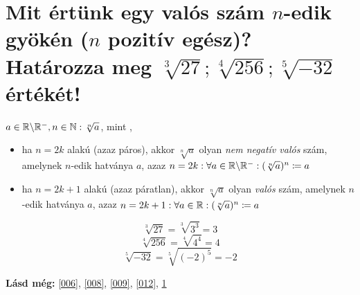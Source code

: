 \section{Mit értünk egy valós szám \texorpdfstring{$n$}{n}-edik gyökén 
  (\texorpdfstring{$n$}{n} pozitív egész)? Határozza meg 
  \texorpdfstring{$\sqrt[3]{27}; \sqrt[4]{256}; \sqrt[5]{-32}$}
  {27**(1/3); 256**(1/4); -32**(1/5)} értékét!}
\label{013}

\begin{defin}
\label{def:nthroot}
$a \in \mathbb{R} \backslash \mathbb{R}^-, n \in \mathbb{N}: \sqrt[n]{a}$, mint
,
\begin{itemize}
  \item ha $n = 2k$ alakú (azaz páros), akkor $\sqrt[n]{a}$ olyan \emph{nem
    negatív valós} szám, amelynek $n$-edik hatványa $a$, azaz
    $n = 2k: \forall a \in \mathbb{R} \backslash \mathbb{R}^-: 
      (\sqrt[n]{a})^n \coloneqq a$
  \item ha $n = 2k+1$ alakú (azaz páratlan), akkor $\sqrt[n]{a}$ olyan 
    \emph{valós} szám, amelynek $n$-edik hatványa $a$, azaz
    $n = 2k + 1: \forall a \in \mathbb{R}: (\sqrt[n]{a})^n \coloneqq a$
\end{itemize}
\end{defin}

\[
  \sqrt[3]{27} = \sqrt[3]{3^3} = 3
\]
\[
  \sqrt[4]{256} = \sqrt[4]{4^4} = 4
\]
\[
  \sqrt[5]{-32} = \sqrt[5]{(-2)^5} = -2
\]

\textbf{Lásd még:} \ref{006}, \ref{008}, \ref{009}, \ref{012}, \ref{013}